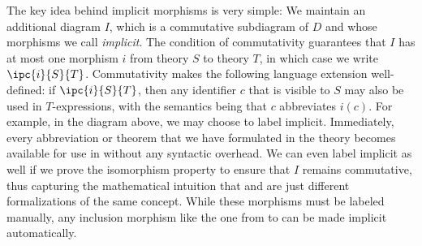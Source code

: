 The key idea behind implicit morphisms is very simple:
We maintain an additional diagram $I$, which is a commutative subdiagram of $D$ and whose morphisms we call \emph{implicit}.
The condition of commutativity guarantees that $I$ has at most one morphism $i$ from theory $S$ to theory $T$, in which case we write $\ipc{i}{S}{T}$.
Commutativity makes the following language extension well-defined: if $\ipc{i}{S}{T}$, then any identifier $c$ that is visible to $S$ may also be used in $T$-expressions, with the semantics being that $c$ abbreviates $i(c)$.
For example, in the diagram above, we may choose to label  implicit.
Immediately, every abbreviation or theorem that we have formulated in the theory  becomes available for use in  without any syntactic overhead.
We can even label  implicit as well if we prove the isomorphism property to ensure that $I$ remains commutative, thus capturing the mathematical intuition that  and  are just different formalizations of the same concept.
While these morphisms must be labeled manually, any inclusion morphism like the one from  to  can be made implicit automatically.

%

